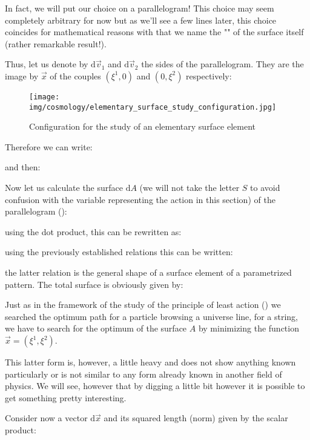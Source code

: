 	In fact, we will put our choice on a parallelogram! This choice may seem completely arbitrary for now but as we'll see a few lines later, this choice coincides for mathematical reasons with that we name the "" of the surface itself (rather remarkable result!).
	
	Thus, let us denote by $\mathrm{d}\vec{v}_1$ and $\mathrm{d}\vec{v}_2$ the sides of the parallelogram. They are the image by $\vec{x}$ of the couples $(\xi^1,0)$ and $(0,\xi^2)$ respectively:
	\begin{figure}[H]
		\begin{center}
		\texttt{[image: img/cosmology/elementary\_surface\_study\_configuration.jpg]}
		\end{center}	
		\caption{Configuration for the study of an elementary surface element}
	\end{figure}
	Therefore we can write:
	
	and then:
	
	Now let us calculate the surface $\mathrm{d}A$ (we will not take the letter $S$ to avoid confusion with the variable representing the action in this section) of the parallelogram ():
	
	using the dot product, this can be rewritten as:
	
	using the previously established relations this can be written:
	
	the latter relation is the general shape of a surface element of a parametrized pattern. The total surface is obviously given by:
	
	Just as in the framework of the study of the principle of least action () we searched the optimum path for a particle browsing a universe line, for a string, we have to search for the optimum of the surface $A$ by minimizing the function $\vec{x}=\left(\xi^1,\xi^2\right)$.
	
	This latter form is, however, a little heavy and does not show anything known particularly or is not similar to any form already known in another field of physics. We will see, however that by digging a little bit however it is possible to get something pretty interesting.
	
	Consider now a vector $\mathrm{d}\vec{x}$ and its squared length (norm) given by the scalar product:
	
